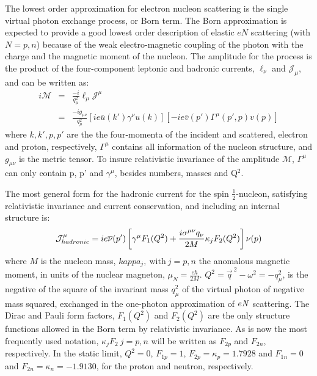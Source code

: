 The lowest order approximation for electron nucleon scattering is the single virtual photon exchange process,
or Born term. The Born approximation is expected to provide a good lowest order description of elastic $eN$ scattering (with $N=p,n$) because
 of the weak electro-magnetic coupling of
the photon with the charge and the magnetic moment of the nucleon. The amplitude for the process is the 
product of the four-component leptonic and hadronic currents, $\ell_{\nu}$ and ${\mathcal J}_{\mu}$, and
can be written as:
\begin{eqnarray}
i{\mathcal M}&=&\frac{-i}{q_{\mu}^2}\ell_{\mu}{\mathcal J}^{\mu} \nonumber \\
&=&\frac{-ig_{\mu\nu}}{q_{\mu}^2}\left[ie\bar{u}(k')\gamma^{\nu}u(k)\right]\left[-ie\bar{v}(p')\Gamma^{\mu}(p',p)v(p)\right]
\end{eqnarray}
where $k,k',p,p'$ are the the four-momenta of the incident and scattered, electron and proton, respectively,
$\Gamma^{\mu}$ contains all information of the nucleon structure, and $g_{\mu\nu}$ 
is the metric tensor. To insure relativistic invariance of the amplitude 
$\mathcal M$, $\Gamma^{\mu}$ can only contain p, p' and $\gamma^{\mu}$, besides numbers, 
masses and Q$^2$.

The most general form for the hadronic current for the spin $\frac{1}{2}$-nucleon, satisfying relativistic invariance 
and current conservation, and including an internal structure is:\\
\begin{equation}
{\mathcal J}_{hadronic}^{\mu}=ie\overline{\nu}(p')\left[\gamma^{\mu}{{F_1(Q^2)}}+
\frac{i\sigma^{\mu\nu}q_{\nu}}{2M}\kappa_{j}{{F_2(Q^2)}}\right]\nu(p) \\
\label{eq:Jhadron}
\end{equation}
\noindent where $M$ is the nucleon mass, $kappa_j,\ \mbox{with}\ j=p,n$ the anomalous magnetic moment, in units of the nuclear magneton,
 $\mu_N=\frac{e\hbar}{2M}$. $Q^2=\vec{q}^{~2}-\omega^2=-q_{\mu}^{ 2}$, 
is the negative of the square of the invariant mass $q_{\mu}^2 $ of the virtual photon of negative mass squared, exchanged in the one-photon 
approximation of $e{\it N}$ scattering. The Dirac and Pauli form factors, $F_1(Q^2)$ and $F_2(Q^2)$ are the only structure functions allowed 
in the Born term by relativistic invariance. As is now the most frequently used notation, $\kappa_jF_2\ j=p,n$ will be written as $F_{2p}$ 
and $F_{2n}$, respectively.  
In the static limit, $Q^2=0$, $F_{1p}=1$, $F_{2p}=\kappa_p=1.7928$ and $F_{1n}=0$ and $F_{2n}=\kappa_n=-1.9130$, 
for the proton and neutron, respectively.

